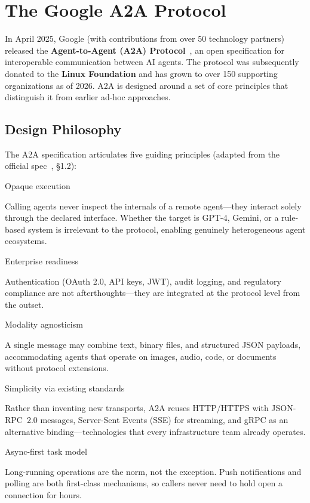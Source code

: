 \section{The Google A2A Protocol}
\label{sec:a2a:google}

In April 2025, Google (with contributions from over 50 technology partners) released the \textbf{Agent-to-Agent (A2A) Protocol}~\cite{google-a2a-2025}, an open specification for interoperable communication between AI agents. The protocol was subsequently donated to the \textbf{Linux Foundation} and has grown to over 150 supporting organizations as of 2026. A2A is designed around a set of core principles that distinguish it from earlier ad-hoc approaches.

\subsection{Design Philosophy}
\label{design-philosophy}

The A2A specification articulates five guiding principles (adapted from the official spec~\cite{google-a2a-2025}, §1.2):

\begin{keybox}
Opaque execution

Calling agents never inspect the internals of a remote agent---they interact solely through the declared interface. Whether the target is GPT-4, Gemini, or a rule-based system is irrelevant to the protocol, enabling genuinely heterogeneous agent ecosystems.

Enterprise readiness

Authentication (OAuth 2.0, API keys, JWT), audit logging, and regulatory compliance are not afterthoughts---they are integrated at the protocol level from the outset.

Modality agnosticism

A single message may combine text, binary files, and structured JSON payloads, accommodating agents that operate on images, audio, code, or documents without protocol extensions.

Simplicity via existing standards

Rather than inventing new transports, A2A reuses HTTP/HTTPS with JSON-RPC~2.0 messages, Server-Sent Events (SSE) for streaming, and gRPC as an alternative binding---technologies that every infrastructure team already operates.

Async-first task model

Long-running operations are the norm, not the exception. Push notifications and polling are both first-class mechanisms, so callers never need to hold open a connection for hours.
\end{keybox}

